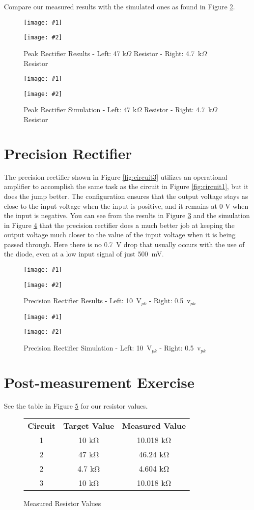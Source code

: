 \documentclass{article}
\newcommand{\twopics}[4]{
\begin{figure}[h!]
\begin{center}
  \begin{minipage}{.45\textwidth}
    \texttt{[image: \#1]}
  \end{minipage}
  \begin{minipage}{.45\textwidth}
    \texttt{[image: \#2]}
  \end{minipage}
  \caption{#4}
  \label{#3}
\end{center}
\end{figure}
}
\begin{document}
Compare our measured results with the simulated ones
as found in Figure \ref{fig:sim2}.

\twopics{scope/Circuit2-47k-ripple-max}{scope/Circuit2-4.7k-max-ripple}{fig:output2}
{Peak Rectifier Results - Left: 47 k$\Omega$ Resistor - Right: 4.7~k$\Omega$ Resistor}

\twopics{multisim/circuit2-47k}{multisim/circuit2-4.7k}{fig:sim2}
{Peak Rectifier Simulation - Left: 47 k$\Omega$ Resistor - Right: 4.7~k$\Omega$ Resistor}

\section{Precision Rectifier}

The precision rectifier shown in Figure \ref{fig:circuit3} 
utilizes an operational amplifier to accomplish the same
task as the circuit in Figure \ref{fig:circuit1}, but
it does the jump better. The configuration ensures that
the output voltage stays as close to the input voltage
when the input is positive, and it remains at 0 V when
the input is negative. You can see from the results in 
Figure \ref{fig:output3} and the simulation in Figure
\ref{fig:sim3} that the precision rectifier does a
much better job at keeping the output voltage
much closer to the value of the input voltage when it is
being passed through. Here there is no 0.7~V drop
that usually occurs with the use of the diode, even at
a low input signal of just 500~mV.

\twopics{scope/Circuit3-10V-max1-max2}{scope/Circuit3-0.5V-max1-max2}{fig:output3}
{Precision Rectifier Results - Left: 10~V$_{pk}$ - Right: 0.5~v$_{pk}$}

\twopics{multisim/circuit3-10V}{multisim/circuit3-0.5V}{fig:sim3}
{Precision Rectifier Simulation - Left: 10~V$_{pk}$ - Right: 0.5~v$_{pk}$}

\section{Post-measurement Exercise}

See the table in Figure \ref{table:resistors} for our
resistor values.

\begin{figure}[h!]
\begin{center}
  \begin{tabular}{c c c}
    \textbf{Circuit} & \textbf{Target Value} & \textbf{Measured Value}\\
    1 & 10 \si\kohm & 10.018 \si\kohm\\
    2 & 47 \si\kohm & 46.24 \si\kohm\\
    2 & 4.7 \si\kohm & 4.604 \si\kohm\\
    3 & 10 \si\kohm & 10.018 \si\kohm
  \end{tabular}
\end{center}
\caption{Measured Resistor Values}
\label{table:resistors}
\end{figure}
\end{document}
